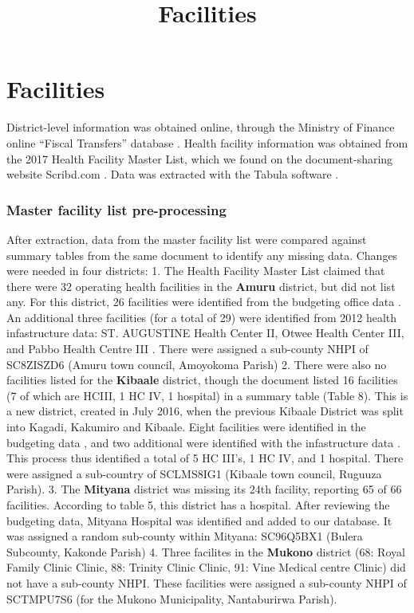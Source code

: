 \documentclass[11pt]{article}
\title{Facilities}
\begin{document}
    
    
    \maketitle
    
    

    
    \hypertarget{facilities}{%
\section{Facilities}\label{facilities}}

District-level information was obtained online, through the Ministry of
Finance online ``Fiscal Transfers'' database \cite{otims_2018}. Health
facility information was obtained from the 2017 Health Facility Master
List, which we found on the document-sharing website Scribd.com
\cite{mohdhi2017}. Data was extracted with the Tabula software
\cite{tabula_2018}.

\hypertarget{master-facility-list-pre-processing}{%
\subsubsection{Master facility list
pre-processing}\label{master-facility-list-pre-processing}}

After extraction, data from the master facility list were compared
against summary tables from the same document to identify any missing
data. Changes were needed in four districts: 1. The Health Facility
Master List claimed that there were 32 operating health facilities in
the \textbf{Amuru} district, but did not list any. For this district, 26
facilities were identified from the budgeting office data
\cite{otims_2016}. An additional three facilities (for a total of 29)
were identified from 2012 health infastructure data: ST. AUGUSTINE
Health Center II, Otwee Health Center III, and Pabbo Health Centre III
\cite{hid2012}. There were assigned a sub-county NHPI of SC8ZISZD6
(Amuru town council, Amoyokoma Parish) 2. There were also no facilities
listed for the \textbf{Kibaale} district, though the document listed 16
facilities (7 of which are HCIII, 1 HC IV, 1 hospital) in a summary
table (Table 8). This is a new district, created in July 2016, when the
previous Kibaale District was split into Kagadi, Kakumiro and Kibaale.
Eight facilities were identified in the budgeting data
\cite{otims_2016}, and two additional were identified with the
infastructure data \cite{hid2012}. This process thus identified a total
of 5 HC III's, 1 HC IV, and 1 hospital. There were assigned a
sub-country of SCLMS8IG1 (Kibaale town council, Ruguuza Parish). 3. The
\textbf{Mityana} district was missing its 24th facility, reporting 65 of
66 facilities. According to table 5, this district has a hospital. After
reviewing the budgeting data, Mityana Hospital was identified and added
to our database. It was assigned a random sub-county within Mityana:
SC96Q5BX1 (Bulera Subcounty, Kakonde Parish) 4. Three facilites in the
\textbf{Mukono} district (68: Royal Family Clinic Clinic, 88: Trinity
Clinic Clinic, 91: Vine Medical centre Clinic) did not have a sub-county
NHPI. These facilities were assigned a sub-county NHPI of SCTMPU7S6 (for
the Mukono Municipality, Nantaburirwa Parish).
\end{document}
